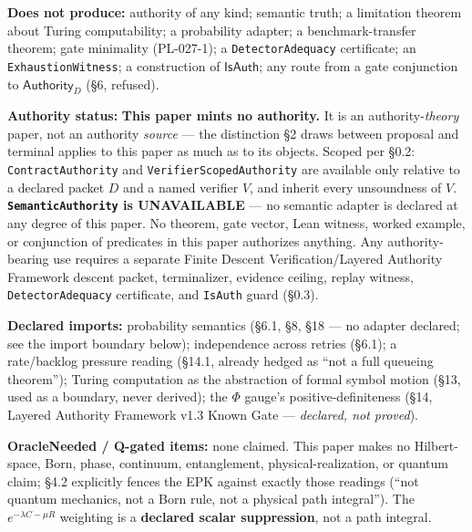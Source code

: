 \documentclass[
  10pt,
]{article}
\DeclareRobustCommand{\texttt}[1]{{\paperSymbolFont\nolinkurl{#1}}}
\begin{document}
\textbf{Does not produce:} authority of any kind; semantic truth; a limitation theorem about Turing computability; a probability adapter; a benchmark-transfer theorem; gate minimality (PL-027-1); a \texttt{DetectorAdequacy} certificate; an \texttt{ExhaustionWitness}; a construction of \protect\hypertarget{math-E0004-0244}{}{\(\mathsf{IsAuth}\)}; any route from a gate conjunction to \protect\hypertarget{math-E0010-0245}{}{\(\mathsf{Authority}_D\)} (§6, refused).

\textbf{Authority status:} \textbf{This paper mints no authority.} It is an authority-\emph{theory} paper, not an authority \emph{source} --- the distinction §2 draws between proposal and terminal applies to this paper as much as to its objects. Scoped per §0.2: \texttt{ContractAuthority} and \texttt{VerifierScopedAuthority} are available only relative to a declared packet \protect\hypertarget{math-E0009-0246}{}{\(D\)} and a named verifier \protect\hypertarget{math-E0012-0247}{}{\(V\)}, and inherit every unsoundness of \protect\hypertarget{math-E0012-0248}{}{\(V\)}. \textbf{\texttt{SemanticAuthority} is UNAVAILABLE} --- no semantic adapter is declared at any degree of this paper. No theorem, gate vector, Lean witness, worked example, or conjunction of predicates in this paper authorizes anything. Any authority-bearing use requires a separate Finite Descent Verification/Layered Authority Framework descent packet, terminalizer, evidence ceiling, replay witness, \texttt{DetectorAdequacy} certificate, and \texttt{IsAuth} guard (§0.3).

\textbf{Declared imports:} probability semantics (§6.1, §8, §18 --- no adapter declared; see the import boundary below); independence across retries (§6.1); a rate/backlog pressure reading (§14.1, already hedged as ``not a full queueing theorem''); Turing computation as the abstraction of formal symbol motion (§13, used as a boundary, never derived); the \protect\hypertarget{math-E0005-0249}{}{\(\Phi\)} gauge's positive-definiteness (§14, Layered Authority Framework v1.3 Known Gate --- \emph{declared, not proved}).

\textbf{OracleNeeded / Q-gated items:} none claimed. This paper makes no Hilbert-space, Born, phase, continuum, entanglement, physical-realization, or quantum claim; §4.2 explicitly fences the EPK against exactly those readings (``not quantum mechanics, not a Born rule, not a physical path integral''). The \protect\hypertarget{math-E0179-0250}{}{\(e^{-\lambda C-\mu R}\)} weighting is a \textbf{declared scalar suppression}, not a path integral.
\end{document}

